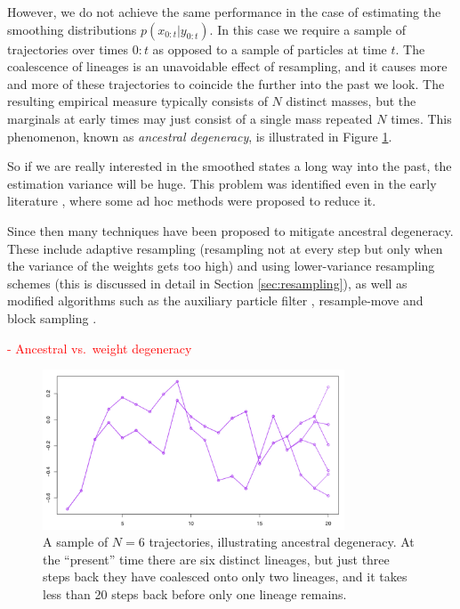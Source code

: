 \documentclass[fleqn]{article}
\theoremstyle{definition}
\begin{document}
However, we do not achieve the same performance in the case of estimating the  smoothing distributions $p(x_{0:t} | y_{0:t})$. In this case we require a sample of trajectories over times $0:t$ as opposed to a sample of particles at time $t$.
The coalescence of lineages is an unavoidable effect of resampling, and it causes more and more of these trajectories to coincide the further into the past we look.
The resulting empirical measure typically consists of $N$ distinct masses, but the marginals at early times may just consist of a single mass repeated $N$ times.
This phenomenon, known as \emph{ancestral degeneracy}, is illustrated in Figure \ref{fig:degeneracy}.

So if we are really interested in the smoothed states a long way into the past, the estimation variance will be huge. This problem was identified even in the early literature \citep{gordon1993}, where some ad hoc methods were proposed to reduce it.

Since then many techniques have been proposed to mitigate ancestral degeneracy. These include adaptive resampling (resampling not at every step but only when the variance of the weights gets too high) and using lower-variance resampling schemes (this is discussed in detail in Section \ref{sec:resampling}), as well as modified algorithms such as the auxiliary particle filter \citep{pitt1999}, resample-move \citep{gilks2001} and block sampling \citep{doucet2006}.

\textcolor{red}{
- Ancestral vs.\ weight degeneracy\\
}

\begin{figure}
\centering
\includegraphics[width=0.8\textwidth]{degeneracy.pdf}
\caption{A sample of $N=6$ trajectories, illustrating ancestral degeneracy. At the ``present'' time there are six distinct lineages, but just three steps back they have coalesced onto only two lineages, and it takes less than 20 steps back before only one lineage remains.}
\label{fig:degeneracy}
\end{figure}
\end{document}
